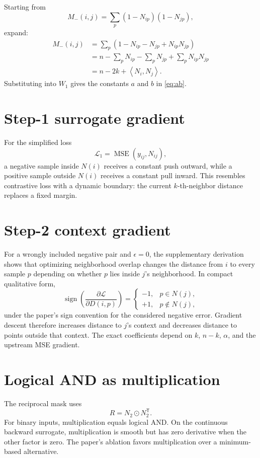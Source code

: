 \documentclass[11pt,oneside,openany]{book}
\theoremstyle{myplain}
\theoremstyle{definition}
\newcommand{\inner}[2]{\left\langle #1,#2\right\rangle}
\newcommand{\transpose}{\mathsf{T}}
\newcommand{\had}{\odot}
\begin{document}
Starting from
\[
M_-(i,j)=\sum_p(1-N_{ip})(1-N_{jp}),
\]
expand:
\begin{align}
M_-(i,j)
&=\sum_p\left(1-N_{ip}-N_{jp}+N_{ip}N_{jp}\right)\\
&=n-\sum_pN_{ip}-\sum_pN_{jp}+\sum_pN_{ip}N_{jp}\\
&=n-2k+\inner{N_i}{N_j}.
\end{align}
Substituting into $W_1$ gives the constants $a$ and $b$ in \cref{eq:ab}.

\section{Step-1 surrogate gradient}

For the simplified loss
\[
\mathcal L_1=\operatorname{MSE}(y_{ij},N_{ij}),
\]
a negative sample inside $N(i)$ receives a constant push outward, while a positive sample outside $N(i)$ receives a constant pull inward. This resembles contrastive loss with a dynamic boundary: the current $k$-th-neighbor distance replaces a fixed margin.

\section{Step-2 context gradient}

For a wrongly included negative pair and $\epsilon=0$, the supplementary derivation shows that optimizing neighborhood overlap changes the distance from $i$ to every sample $p$ depending on whether $p$ lies inside $j$'s neighborhood. In compact qualitative form,
\[
\operatorname{sign}\!\left(\frac{\partial\mathcal L}{\partial D(i,p)}\right)
=
\begin{cases}
-1,&p\in N(j),\\
+1,&p\notin N(j),
\end{cases}
\]
under the paper's sign convention for the considered negative error. Gradient descent therefore increases distance to $j$'s context and decreases distance to points outside that context. The exact coefficients depend on $k$, $n-k$, $\alpha$, and the upstream MSE gradient.

\section{Logical AND as multiplication}

The reciprocal mask uses
\[
R=N_2\had N_2^\transpose.
\]
For binary inputs, multiplication equals logical AND. On the continuous backward surrogate, multiplication is smooth but has zero derivative when the other factor is zero. The paper's ablation favors multiplication over a minimum-based alternative.
\end{document}
